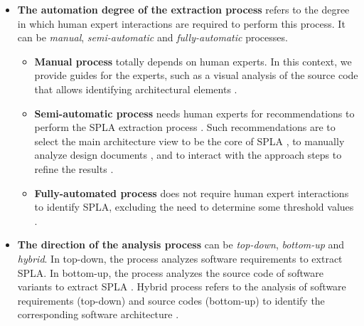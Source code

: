 \documentclass[graybox]{svmult}
\begin{document}
\begin{itemize}

	\item \textbf{The automation degree of the extraction process} refers to the degree in which human expert interactions are required to perform this process. It can be \textit{manual}, \textit{semi-automatic} and \textit{fully-automatic} processes.  
	
    \begin{itemize}
        \item \textbf{Manual process} totally depends on human experts.  In this context, we provide guides for the experts, such as a visual analysis of the source code that allows identifying architectural elements \cite{langelier2005visualization,22_wu2011recovering}. 	

        \item \textbf{Semi-automatic process} needs human experts for recommendations to perform the SPLA extraction process \cite{kang2005feature}. Such recommendations are to select the main architecture view to be the core of SPLA \cite{kang2005feature}, to manually analyze design documents \cite{pinzger2004architecture}, and to interact with the approach steps to refine the results \cite{erdemir2011object}. 

        \item \textbf{Fully-automated process} does not require human expert interactions to identify SPLA, excluding the need to determine some threshold values \cite{mende2008supporting,shatnawi2017recovering}. 

    \end{itemize}

	\item \textbf{The direction of the analysis process} can be \textit{top-down}, \textit{bottom-up} and \textit{hybrid}. 
	In top-down, the process analyzes software requirements to extract SPLA.  In bottom-up, the process analyzes the source code of software variants to extract SPLA \cite{frenzel2007extending,kang2005feature,koschke2009extending,shatnawi2017recovering}. 
	Hybrid process refers to the analysis of software requirements (top-down) and source codes (bottom-up) to identify the corresponding software architecture \cite{allier2009identifying}. 
	

\end{itemize}
\end{document}
